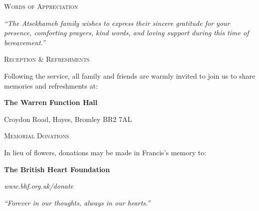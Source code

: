 
\thispagestyle{empty} %
\label{toc:appreciation}


\begin{center}
  \vspace*{6mm}
  
  {\large\scshape\color{primary} Words of Appreciation}
  
  \vspace{4mm}
  \begin{minipage}{0.88\linewidth}
    \centering\small\itshape
    ``The Atsekhameh family wishes to express their sincere gratitude for your presence, comforting prayers, kind words, and loving support during this time of bereavement.''
  \end{minipage}

  \vspace{10mm}
  \thinseparator
  \vspace{6mm}

  {\large\scshape\color{primary} Reception \& Refreshments}
  
  \vspace{3mm}
  {\small Following the service, all family and friends are warmly invited to join us to share memories and refreshments at:\par}
  \vspace{3mm}
  {\textbf{The Warren Function Hall}\par}
  {\small Croydon Road, Hayes, Bromley BR2 7AL\par}

  \vspace{10mm}
  \thinseparator
  \vspace{6mm}

  {\large\scshape\color{primary} Memorial Donations}
  
  \vspace{3mm}
  {\small In lieu of flowers, donations may be made in Francis's memory to:\par}
  \vspace{2mm}
  {\textbf{The British Heart Foundation}\par}
  {\small \textit{www.bhf.org.uk/donate}\par}

  \vfill
  
  {\small\textit{``Forever in our thoughts, always in our hearts.''}}
  \vspace*{4mm}
\end{center}